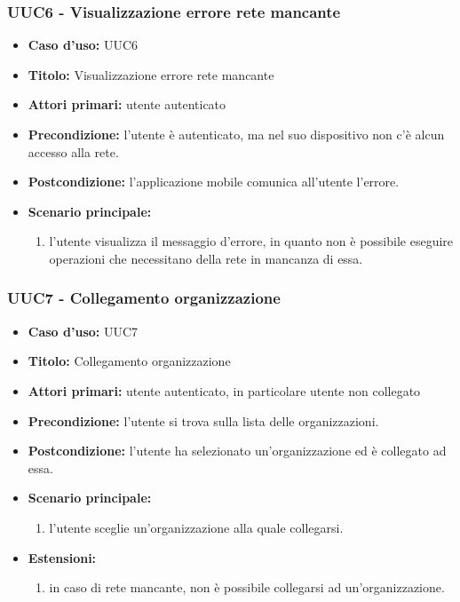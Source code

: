 \documentclass[casi-duso]{subfiles}
\begin{document}
\subsubsection{UUC6 - Visualizzazione errore rete mancante}
\label{subsub:UUC6utente}
\begin{itemize}
  \item \textbf{Caso d’uso:} UUC6
  \item \textbf{Titolo:} Visualizzazione errore rete mancante
  \item \textbf{Attori primari:} utente autenticato
  \item \textbf{Precondizione:} l'utente è autenticato, ma nel suo dispositivo non c'è alcun accesso alla rete.
  \item \textbf{Postcondizione:} l'applicazione mobile comunica all'utente l'errore.
  \item \textbf{Scenario principale:} 
  \begin{enumerate}
    \item l'utente visualizza il messaggio d'errore, in quanto non è possibile eseguire operazioni che necessitano della rete in mancanza di essa.
  \end{enumerate}  
\end{itemize}

\subsubsection{UUC7 - Collegamento organizzazione}
\label{subsub:UUC7utente}
\begin{itemize}
  \item \textbf{Caso d’uso:} UUC7
  \item \textbf{Titolo:} Collegamento organizzazione
  \item \textbf{Attori primari:} utente autenticato, in particolare utente non collegato
  \item \textbf{Precondizione:} l'utente si trova sulla lista delle organizzazioni.
  \item \textbf{Postcondizione:} l'utente ha selezionato un'organizzazione ed è collegato ad essa.
  \item \textbf{Scenario principale:} 
  \begin{enumerate}
    \item l'utente sceglie un'organizzazione alla quale collegarsi.
  \end{enumerate}  
  \item \textbf{Estensioni:} 
  \begin{enumerate}
    \item in caso di rete mancante, non è possibile collegarsi ad un'organizzazione.
  \end{enumerate}  
\end{itemize}
\end{document}
